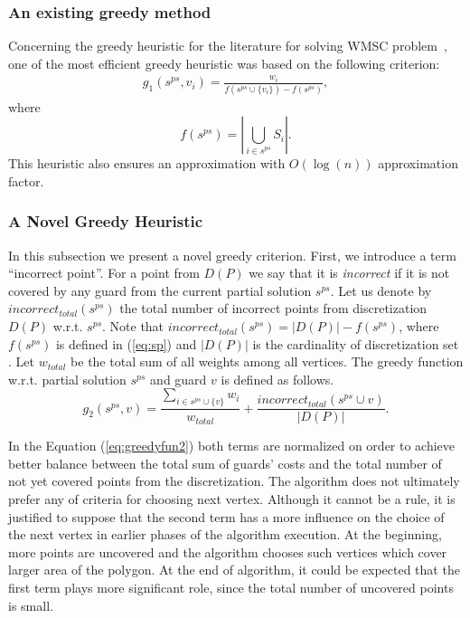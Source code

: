 \documentclass[runningheads,a4paper]{elsarticle}
\begin{document}
	\subsubsection{An existing greedy method}
	
	Concerning the greedy heuristic for the literature for solving WMSC problem~\cite{chvatal1979greedy, lovasz1975ratio}, one of the most efficient greedy heuristic was based on the following criterion:
	\begin{align}\label{eq:Lovasz}
	g_1(s^{ps}, v_i) = \frac{w_{i}}{ f(s^{ps} \cup \{v_i\})  - f(s^{ps})},
	\end{align}
	where
\begin{equation}\label{eq:sp}
    f(s^{ps}) = \left|\bigcup_{i \in s^{ps}} S_i \right|.
    \end{equation}
	This heuristic  also ensures an approximation with $O(\log(n))$ approximation factor.
	
	\subsubsection{A Novel Greedy Heuristic}
	In this subsection we present a novel greedy criterion. First, we introduce a term  ``incorrect point''. For a point from $D(P)$ we say that it is \textit{incorrect} if it is not covered by any guard from the current partial solution $s^{ps}$. Let us denote by $incorrect_{total}(s^{ps})$ the total number of incorrect points from discretization $D(P)$ w.r.t. $s^{ps}$. Note that  $incorrect_{total}(s^{ps}) = |D(P)|-f(s^{ps})$, where $f(s^{ps})$ is defined in (\ref{eq:sp}) and $|D(P)|$ is the cardinality of discretization set . Let $w_{total}$ be the total sum of all weights among all vertices. The greedy function w.r.t. partial solution $s^{ps}$ and  guard $v$ is defined as follows.
	\begin{equation}\label{eq:greedyfun2}
    g_2(s^{ps}, v)  =    \frac{\sum_{i \in s^{ps} \cup \{v\}} w_i}{w_{total}}+ \frac{incorrect_{total}(s^{ps}\cup v)}{|D(P)|}.
	\end{equation}

	In the Equation  (\ref{eq:greedyfun2}) both terms are normalized on order to achieve better balance between the total sum of guards' costs and the total number of not yet covered points from the discretization. The algorithm does not  ultimately prefer any of criteria for choosing next vertex. Although it cannot be a rule, it is justified to suppose that the second term has a more influence on the choice of the next vertex in earlier phases of the algorithm execution. At the beginning, more points are uncovered and the algorithm  chooses such vertices which cover larger area of the polygon. At the end of algorithm, it could be expected that the first term plays more significant role, since the total number of uncovered points is small.
	
\end{document}
